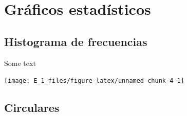 \documentclass[10pt,]{krantz}
\newenvironment{Shaded}{\begin{snugshade}}{\end{snugshade}}
\newcommand{\DataTypeTok}[1]{\textcolor[rgb]{0.13,0.29,0.53}{#1}}
\newcommand{\DecValTok}[1]{\textcolor[rgb]{0.00,0.00,0.81}{#1}}
\newcommand{\KeywordTok}[1]{\textcolor[rgb]{0.13,0.29,0.53}{\textbf{#1}}}
\newcommand{\NormalTok}[1]{#1}
\newcommand{\OperatorTok}[1]{\textcolor[rgb]{0.81,0.36,0.00}{\textbf{#1}}}
\newcommand{\StringTok}[1]{\textcolor[rgb]{0.31,0.60,0.02}{#1}}
\theoremstyle{definition}
\theoremstyle{definition}
\theoremstyle{definition}
\theoremstyle{definition}
\theoremstyle{remark}
\begin{document}
\hypertarget{gruxe1ficos-estaduxedsticos}{%
\chapter{Gráficos estadísticos}\label{gruxe1ficos-estaduxedsticos}}

\hypertarget{histograma-de-frecuencias}{%
\section{Histograma de frecuencias}\label{histograma-de-frecuencias}}

\begin{Shaded}
\end{Shaded}

Some text

\begin{Shaded}
\end{Shaded}

\begin{center}\texttt{[image: E\_1\_files/figure-latex/unnamed-chunk-4-1]} \end{center}

\hypertarget{circulares}{%
\section{Circulares}\label{circulares}}
\end{document}
